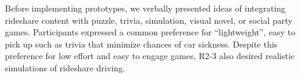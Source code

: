 Before implementing prototypes, we verbally presented ideas of integrating rideshare content with puzzle, trivia, simulation, visual novel, or social party games. 
Participants expressed a common preference for ``lightweight'', easy to pick up such as trivia that minimize chances of car sickness. Despite this preference for low effort and easy to engage games, R2-3 also desired realistic simulations of rideshare driving.



